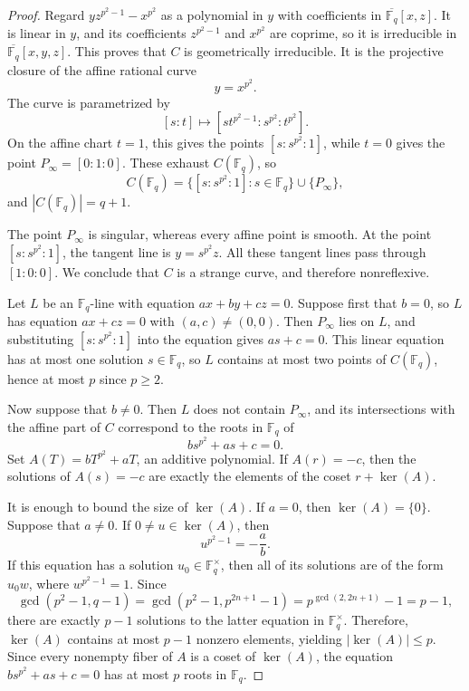 \documentclass[12pt,reqno]{amsart}
\theoremstyle{definition}
\theoremstyle{remark}
\newcommand{\Fq}{\mathbb{F}_q}
\begin{document}
\begin{proof}
Regard $yz^{p^2-1}-x^{p^2}$ as a polynomial in $y$ with coefficients in
$\overline{\Fq}[x,z]$. It is linear in $y$, and its coefficients
$z^{p^2-1}$ and $x^{p^2}$ are coprime, so it is irreducible in
$\overline{\Fq}[x,y,z]$. This proves that $C$ is geometrically irreducible. It is the projective closure of the affine rational curve
\[
y=x^{p^2}.
\]
The curve is parametrized by
\[
[s:t]\longmapsto
[st^{p^2-1}:s^{p^2}:t^{p^2}].
\]
On the affine chart $t=1$, this gives the points
$[s:s^{p^2}:1]$, while $t=0$ gives the point
$P_\infty=[0:1:0]$. These exhaust $C(\Fq)$, so
\[
C(\Fq)
=
\{[s:s^{p^2}:1]:s\in\Fq\}\cup\{P_\infty\},
\]
and $|C(\Fq)|=q+1$.

The point $P_\infty$ is singular, whereas every affine point is smooth. At the point $[s:s^{p^2}:1]$, the tangent line is $y=s^{p^2}z$. All these tangent lines pass through $[1:0:0]$. We conclude that $C$ is a strange curve, and therefore nonreflexive.

Let $L$ be an $\Fq$-line with equation $ax+by+cz=0$. Suppose first that $b=0$, so $L$ has equation $ax+cz=0$ with $(a,c)\neq(0,0)$. Then $P_\infty$ lies on $L$, and substituting $[s:s^{p^2}:1]$ into the equation gives $as+c=0$. This linear equation has at most one solution $s\in\Fq$, so $L$ contains at most two points of $C(\Fq)$, hence at most $p$ since $p\ge 2$.

Now suppose that $b\neq0$. Then $L$ does not contain $P_\infty$, and its
intersections with the affine part of $C$ correspond to the roots in
$\Fq$ of
\[
bs^{p^2}+as+c=0.
\]
Set $A(T)=bT^{p^2}+aT$, an additive polynomial. If
$A(r)=-c$, then the solutions of $A(s)=-c$ are exactly the elements of
the coset $r+\ker(A)$.

It is enough to bound the size of $\ker(A)$. If $a=0$, then
$\ker(A)=\{0\}$. Suppose that $a\neq 0$. If $0\neq u\in\ker(A)$, then
\[
u^{p^2-1}=-\frac{a}{b}.
\]
If this equation has a solution $u_0\in\Fq^\times$, then all of its solutions are of the form $u_0w$, where $w^{p^2-1}=1$. Since
\[
\gcd(p^2-1,q-1) = \gcd(p^2-1,p^{2n+1}-1) = p^{\gcd(2,2n+1)}-1 = p-1,
\]
there are exactly $p-1$ solutions to the latter equation in
$\Fq^\times$. Therefore, $\ker(A)$ contains at most $p-1$ nonzero elements, yielding $|\ker(A)|\leq p$. Since every nonempty fiber of $A$ is a coset of $\ker(A)$, the equation $bs^{p^2}+as+c=0$ has at most $p$ roots in $\Fq$.


\end{proof}
\end{document}

